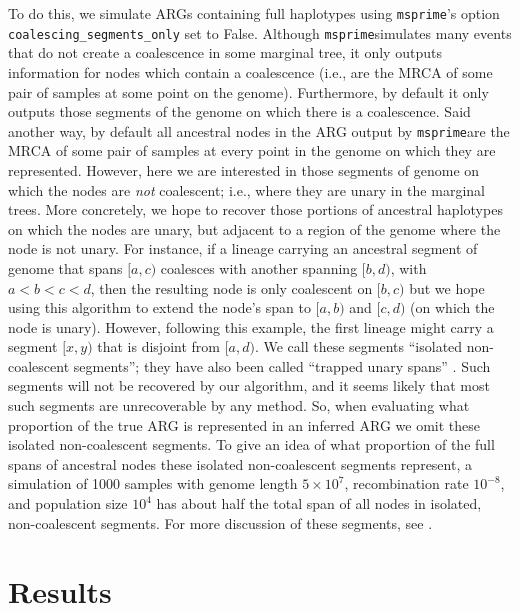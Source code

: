 \documentclass[10pt,twoside,lineno]{gsajnl}
\newcommand{\msprime}{\texttt{msprime}}
\begin{document}
To do this, we simulate ARGs containing full haplotypes using \msprime's 
option \texttt{coalescing\_segments\_only} set to False.
Although \msprime simulates many events that do not create a coalescence in some marginal tree,
it only outputs information for nodes which contain a coalescence
(i.e., are the MRCA of some pair of samples at some point on the genome).
Furthermore, by default it only outputs those segments of the genome
on which there is a coalescence.
Said another way, by default all ancestral nodes in the ARG
output by \msprime are the MRCA of some pair of samples at every point in the genome
on which they are represented.
However, here we are interested in those segments of genome
on which the nodes are \emph{not} coalescent;
i.e., where they are unary in the marginal trees.
More concretely, we hope to recover those portions of ancestral haplotypes
on which the nodes are unary, but adjacent to a region of the genome where the node is not unary.
For instance, if a lineage carrying an ancestral segment of genome that spans $[a, c)$
coalesces with another spanning $[b, d)$, with $a < b < c < d$,
then the resulting node is only coalescent on $[b, c)$ but we hope using this algorithm
to extend the node's span to $[a, b)$ and $[c, d)$
(on which the node is unary).
However, following this example, the first lineage might carry a segment $[x, y)$
that is disjoint from $[a, d)$.
We call these segments ``isolated non-coalescent segments'';
they have also been called ``trapped unary spans'' \citep[by][]{XXX}.
Such segments will not be recovered by our algorithm,
and it seems likely that most such segments are unrecoverable by any method.
So, when evaluating what proportion of the true ARG is represented in an inferred ARG
we omit these isolated non-coalescent segments.
To give an idea of what proportion of the full spans of ancestral nodes
these isolated non-coalescent segments represent,
a simulation of 1000 samples
with genome length $5\times 10^7$, recombination rate $10^{-8}$, and population size $10^4$
has about half the total span of all nodes in isolated, non-coalescent segments.
For more discussion of these segments, see \citet{baumdicker2021efficient}.


\section{Results}


\end{document}
